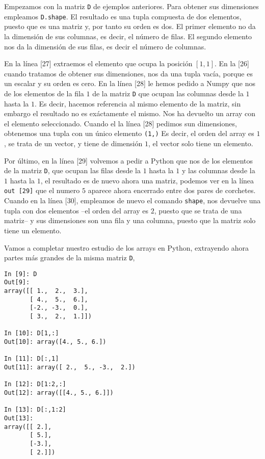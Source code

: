  \begin{paracol}{2}
 Empezamos con la matriz \texttt{D} de ejemplos anteriores. Para obtener sus dimensiones empleamos \texttt{D.shape}. El resultado es una tupla compuesta de dos elementos, puesto que es una matriz y, por tanto su orden es dos. El primer elemento no da la dimensión de sus columnas, es decir, el número de filas. El segundo elemento nos da la dimensión de sus filas, es decir el número de columnas. 
 
 En la línea [27] extraemos el elemento que ocupa la posición $[1,1]$. En la [26] cuando tratamos de obtener sus dimensiones, nos da una tupla vacía, porque es un escalar y su orden es cero. En la línea [28] le hemos pedido a Numpy que nos de los elementos de la fila $1$ de la matriz \texttt{D} que ocupan las columnas desde la $1$ hasta la $1$. Es decir, hacemos referencia al mismo elemento de la matriz, sin embargo el resultado no es exáctamente el mismo. Nos ha devuelto un array con el elemento seleccionado. Cuando el la línea [28] pedimos sun dimensiones, obtenemos una tupla con un único elemento \texttt{(1,)} Es decir, el orden del array es $1$, se trata de un vector, y tiene de dimensión $1$, el vector solo tiene un elemento. 
 
 Por último, en la línea [29] volvemos a pedir a Python que nos de los elementos de la matriz \texttt{D}, que ocupan las filas desde la $1$ hasta la $1$ y las columnas desde la $1$ hasta la $1$, el resultado es de nuevo ahora una matriz, podemos ver en la línea \texttt{out [29]} que el numero $5$ aparece ahora encerrado entre dos pares de corchetes. Cuando en la línea [30], empleamos de nuevo el comando \texttt{shape}, nos devuelve una tupla con dos elementos --el orden del array es $2$, puesto que se trata de una matriz-- y sus dimensiones son una fila y una columna, puesto que la matriz solo tiene un elemento.  

 Vamos a completar nuestro estudio de los arrays en Python, extrayendo ahora partes más grandes de la misma matriz \texttt{D},
 \end{paracol}
\begin{center}
 \begin{minipage}{0.3\textwidth}
    \begin{verbatim}
In [9]: D
Out[9]: 
array([[ 1.,  2.,  3.],
       [ 4.,  5.,  6.],
       [-2., -3.,  0.],
       [ 3.,  2.,  1.]])

In [10]: D[1,:]
Out[10]: array([4., 5., 6.])

In [11]: D[:,1]
Out[11]: array([ 2.,  5., -3.,  2.])

In [12]: D[1:2,:]
Out[12]: array([[4., 5., 6.]])

In [13]: D[:,1:2]
Out[13]: 
array([[ 2.],
       [ 5.],
       [-3.],
       [ 2.]])
    \end{verbatim}
\end{minipage}
\end{center}
